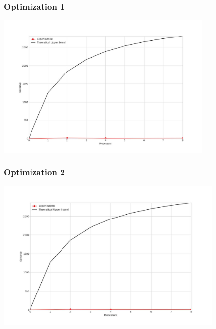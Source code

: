 \subsubsection{Optimization 1}
\begin{center}
    \resizebox{0.95\textwidth}{!}{}
    \includegraphics[width=0.8\textwidth]{../img/speedup-graph_type-tile-410000-O1}
\end{center}

\clearpage
\subsubsection{Optimization 2}
\begin{center}
    \resizebox{0.95\textwidth}{!}{}
    \includegraphics[width=0.84\textwidth]{../img/speedup-graph_type-tile-410000-O2}
\end{center}

